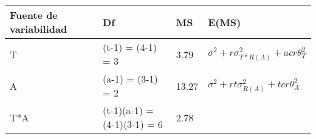 \documentclass[11pt]{article}
\begin{document}
\begin{longtable}[]{@{}llll@{}}
\toprule
\begin{minipage}[b]{0.20\columnwidth}\raggedright
Fuente de variabilidad\strut
\end{minipage} & \begin{minipage}[b]{0.26\columnwidth}\raggedright
Df\strut
\end{minipage} & \begin{minipage}[b]{0.07\columnwidth}\raggedright
MS\strut
\end{minipage} & \begin{minipage}[b]{0.38\columnwidth}\raggedright
E(MS)\strut
\end{minipage}\tabularnewline
\midrule
\endhead
\begin{minipage}[t]{0.20\columnwidth}\raggedright
T\strut
\end{minipage} & \begin{minipage}[t]{0.26\columnwidth}\raggedright
(t-1) = (4-1) = 3\strut
\end{minipage} & \begin{minipage}[t]{0.05\columnwidth}\raggedright
3.79\strut
\end{minipage} & \begin{minipage}[t]{0.38\columnwidth}\raggedright
\(\sigma^2 + r\sigma^2_{T*R(A)}+acr\theta_T^2\)\strut
\end{minipage}\tabularnewline
\begin{minipage}[t]{0.20\columnwidth}\raggedright
A\strut
\end{minipage} & \begin{minipage}[t]{0.26\columnwidth}\raggedright
(a-1) = (3-1) = 2\strut
\end{minipage} & \begin{minipage}[t]{0.05\columnwidth}\raggedright
13.27\strut
\end{minipage} & \begin{minipage}[t]{0.38\columnwidth}\raggedright
\(\sigma^2 + rt\sigma^2_{R(A)} + tcr\theta_{A}^2\)\strut
\end{minipage}\tabularnewline
\begin{minipage}[t]{0.20\columnwidth}\raggedright
T*A\strut
\end{minipage} & \begin{minipage}[t]{0.26\columnwidth}\raggedright
(t-1)(a-1) = (4-1)(3-1) = 6\strut
\end{minipage} & \begin{minipage}[t]{0.05\columnwidth}\raggedright
2.78\strut
\end{minipage} & \begin{minipage}[t]{0.38\columnwidth}\raggedright

\end{minipage}
\end{longtable}
\end{document}
